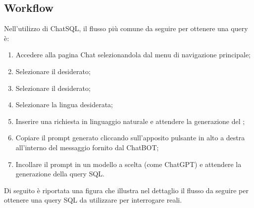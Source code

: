 \subsection{Workflow}
\par Nell'utilizzo di ChatSQL, il flusso più comune da seguire per ottenere una query  è:
\begin{enumerate}
  \item Accedere alla pagina Chat selezionandola dal menu di navigazione principale;
  \item Selezionare il  desiderato;
  \item Selezionare il  desiderato;
  \item Selezionare la lingua desiderata;
  \item Inserire una richiesta in linguaggio naturale e attendere la generazione del ;
  \item Copiare il prompt generato cliccando sull'apposito pulsante in alto a destra all'interno del messaggio fornito dal ChatBOT;
  \item Incollare il prompt in un modello  a scelta (come ChatGPT) e attendere la generazione della query SQL.
\end{enumerate}

\vspace{\baselineskip}
\par Di seguito è riportata una figura che illustra nel dettaglio il flusso da seguire per ottenere una query SQL da utilizzare per interrogare  reali.

